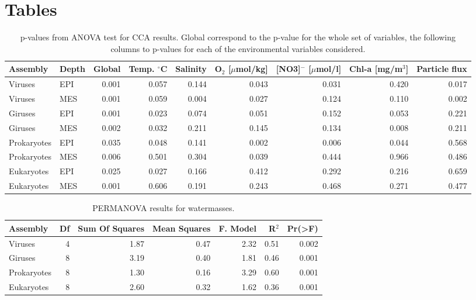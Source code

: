 \documentclass[fleqn,10pt]{wlscirep}
\begin{document}
\section*{Tables}

\begin{table}[ht]
\centering
\caption{\label{tab:CCA} p-values from ANOVA test for CCA results. Global correspond to the p-value for the whole set of variables, the following columns to p-values for each of the environmental variables considered.}
\begin{tabular}{llrrrrrrr}
\hline
 Assembly& Depth & Global & Temp. $^\circ$C & Salinity & O$_2$ [$\mu$mol/kg] &[NO3]$^-$  [$\mu$mol/l]	& Chl-a [mg/m$^3$] &	 Particle flux\\
\hline
\hline
Viruses & EPI & 0.001 & 0.057 & 0.144 & 0.043 & 0.031 & 0.420 & 0.017\\
Viruses & MES & 0.001 & 0.059 & 0.004 & 0.027 & 0.124 & 0.110 & 0.002\\
Giruses & EPI & 0.001 & 0.023 & 0.074 & 0.051 & 0.152 & 0.053 & 0.221\\
Giruses & MES & 0.002 & 0.032 & 0.211 & 0.145 & 0.134 & 0.008 & 0.211\\
Prokaryotes & EPI & 0.035 & 0.048 & 0.141 & 0.002 & 0.006 & 0.044 & 0.568\\
Prokaryotes & MES & 0.006 & 0.501 & 0.304 & 0.039 & 0.444 & 0.966 & 0.486\\
Eukaryotes & EPI & 0.025 & 0.027 & 0.166 & 0.412 & 0.292 & 0.216 & 0.659\\
Eukaryotes & MES & 0.001 & 0.606 & 0.191 & 0.243 & 0.468 & 0.271 & 0.477\\
\hline
\hline
\end{tabular}
\end{table}

\begin{table}[ht]
\centering
\caption{\label{tab:PWM} PERMANOVA results for watermasses.}
\begin{tabular}{lrrrrrr}
\hline
Assembly & Df & Sum Of Squares & Mean Squares & F. Model & R$^2$ & Pr(>F) \\
\hline
\hline
Viruses	& 4	& 1.87 &	0.47 & 2.32 &	0.51 &	0.002\\
Giruses	& 8	& 3.19 &	0.40 & 1.81 &	0.46 &	0.001\\
Prokaryotes & 8	& 1.30 &	0.16 & 3.29 &	0.60 &	0.001\\
Eukaryotes	& 8	& 2.60 &	0.32 & 1.62 &	0.36 &	0.001\\
\hline
\hline
\end{tabular}
\end{table}
\end{document}
